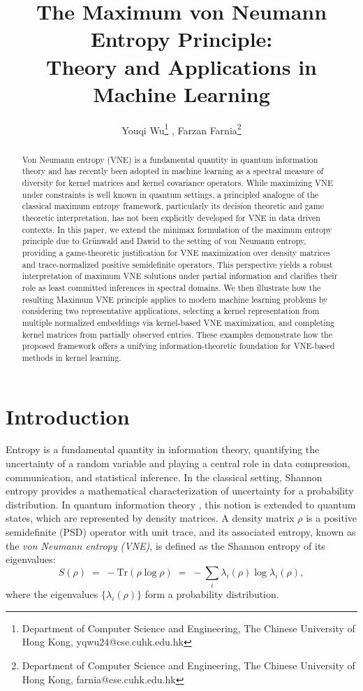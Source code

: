 \documentclass{article}
\title{The Maximum von Neumann Entropy Principle:\\ Theory and Applications in Machine Learning 
}
\date{}
\author{
Youqi Wu\thanks{Department of Computer Science and Engineering, The Chinese University of Hong Kong, yqwu24@cse.cuhk.edu.hk} ,
Farzan Farnia\thanks{Department of Computer Science and Engineering, The Chinese University of Hong Kong, farnia@cse.cuhk.edu.hk}
}
\theoremstyle{plain}
\theoremstyle{definition}
\begin{document}
\maketitle


\begin{abstract}
Von Neumann entropy (VNE) is a fundamental quantity in quantum information theory and has recently been adopted in machine learning as a spectral measure of diversity for kernel matrices and kernel covariance operators. While maximizing VNE under constraints is well known in quantum settings, a principled analogue of the classical maximum entropy framework, particularly its decision theoretic and game theoretic interpretation, has not been explicitly developed for VNE in data driven contexts. In this paper, we extend the minimax formulation of the maximum entropy principle due to Grünwald and Dawid to the setting of von Neumann entropy, providing a game-theoretic justification for VNE maximization over density matrices and trace-normalized positive semidefinite operators. This perspective yields a robust interpretation of maximum VNE solutions under partial information and clarifies their role as least committed inferences in spectral domains. We then illustrate how the resulting Maximum VNE principle applies to modern machine learning problems by considering two representative applications, selecting a kernel representation from multiple normalized embeddings via kernel-based VNE maximization, and completing kernel matrices from partially observed entries. These examples demonstrate how the proposed framework offers a unifying information-theoretic foundation for VNE-based methods in kernel learning.
\end{abstract}

\section{Introduction}
Entropy is a fundamental quantity in information theory, quantifying the uncertainty of a random variable and playing a central role in data compression, communication, and statistical inference. In the classical setting, Shannon entropy \cite{Shannon1948} provides a mathematical characterization of uncertainty for a probability distribution. In quantum information theory \cite{vonNeumann1955,NielsenChuang2000}, this notion is extended to quantum states, which are represented by density matrices. A density matrix $\rho$ is a positive semidefinite (PSD) operator with unit trace, and its associated entropy, known as the \emph{von Neumann entropy (VNE)}, is defined as the Shannon entropy of its eigenvalues:
\begin{equation}
S(\rho) \;=\; -\mathrm{Tr}(\rho \log \rho) \;=\; -\sum_i \lambda_i(\rho)\log \lambda_i(\rho),
\end{equation}
where the eigenvalues $\{\lambda_i(\rho)\}$ form a probability distribution.
\end{document}
